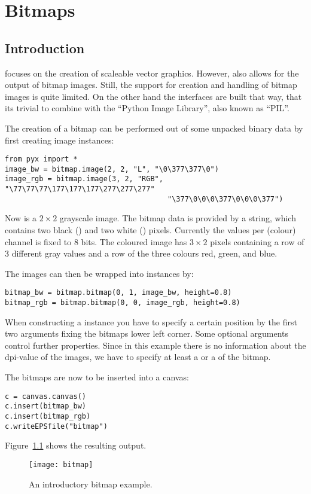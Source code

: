\chapter{Bitmaps}
\section{Introduction}
\PyX{} focuses on the creation of scaleable vector graphics. However,
\PyX{} also allows for the output of bitmap images. Still, the support
for creation and handling of bitmap images is quite limited. On the
other hand the interfaces are built that way, that its trivial to
combine \PyX{} with the ``Python Image Library'', also known as
``PIL''.

The creation of a bitmap can be performed out of some unpacked binary
data by first creating image instances:
\begin{verbatim}
from pyx import *
image_bw = bitmap.image(2, 2, "L", "\0\377\377\0")
image_rgb = bitmap.image(3, 2, "RGB", "\77\77\77\177\177\177\277\277\277"
                                      "\377\0\0\0\377\0\0\0\377")
\end{verbatim}
Now  is a $2\times2$ grayscale image. The bitmap data
is provided by a string, which contains two black () and two white () pixels. Currently
the values per (colour) channel is fixed to 8 bits. The coloured image
 has $3\times2$ pixels containing a row of 3 different
gray values and a row of the three colours red, green, and blue.

The images can then be wrapped into  instances by:
\begin{verbatim}
bitmap_bw = bitmap.bitmap(0, 1, image_bw, height=0.8)
bitmap_rgb = bitmap.bitmap(0, 0, image_rgb, height=0.8)
\end{verbatim}
When constructing a  instance you have to specify a
certain position by the first two arguments fixing the bitmaps lower
left corner. Some optional arguments control further properties. Since
in this example there is no information about the dpi-value of the
images, we have to specify at least a  or a 
of the bitmap.

The bitmaps are now to be inserted into a canvas:
\begin{verbatim}
c = canvas.canvas()
c.insert(bitmap_bw)
c.insert(bitmap_rgb)
c.writeEPSfile("bitmap")
\end{verbatim}
Figure~\ref{fig:bitmap} shows the resulting output.
\begin{figure}[ht]
\centerline{\texttt{[image: bitmap]}}
\caption{An introductory bitmap example.}
\label{fig:bitmap}
\end{figure}

